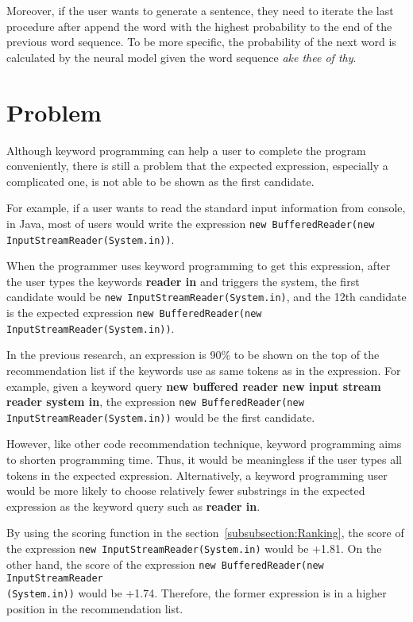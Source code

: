 \documentclass[PRO,english]{ipsj}
\begin{document}
Moreover, if the user wants to generate a sentence, they need to iterate the last procedure after append the word with the highest probability to the end of the previous word sequence. To be more specific, the probability of the next word is calculated by the neural model given the word sequence \textit{ake thee of thy}.


\section{Problem}
Although keyword programming can help a user to complete the program conveniently, there is still a problem that the expected expression, especially a complicated one, is not able to be shown as the first candidate.

For example, if a user wants to read the standard input information from console, in Java, most of users would write the expression \texttt{new BufferedReader(new InputStreamReader(System.in))}. 

When the programmer uses keyword programming to get this expression, after the user types the keywords \textbf{reader in} and triggers the system, the first candidate would be \texttt{new InputStreamReader(System.in)}, and the 12th candidate is the expected expression \texttt{new BufferedReader(new InputStreamReader(System.in))}. 



In the previous research, an expression is 90\% to be shown on the top of the recommendation list if the keywords use as same tokens as in the expression. For example, given a keyword query \textbf{new buffered reader new input stream reader system in}, the expression \texttt{new BufferedReader(new InputStreamReader(System.in))} would be the first candidate.

However, like other code recommendation technique, keyword programming aims to shorten programming time. Thus, it would be meaningless if the user types all tokens in the expected expression. Alternatively, a keyword programming user would be more likely to choose relatively fewer substrings in the expected expression as the keyword query such as \textbf{reader in}. 

By using the scoring function in the section~\ref{subsubsection:Ranking}, the score of the expression \texttt{new InputStreamReader(System.in)} would be +1.81. On the other hand, the score of the expression \texttt{new BufferedReader(new InputStreamReader}\\\texttt{(System.in))} would be +1.74. Therefore, the former expression is in a higher position in the recommendation list.
\end{document}
